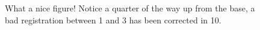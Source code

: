 \begin{figure}
    \caption{What a nice figure! Notice a quarter of the way up from the base, a bad registration between 1 and 3 has been corrected in 10.}
    \label{fig:dummy_cross_sections}
  \end{figure}
  
